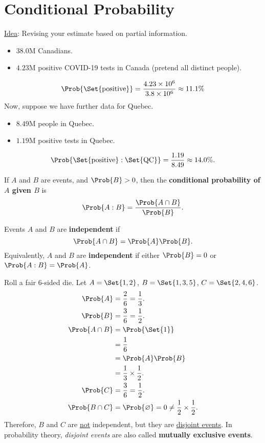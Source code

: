 \section*{Conditional Probability}
\underline{Idea}: Revising your estimate based on
partial information.
\begin{Example}{}{}
    \begin{itemize}
        \item $ 38.0 $M Canadians.
        \item $ 4.23 $M positive COVID-19 tests in Canada
              (pretend all distinct people).
    \end{itemize}
    \[ \Prob{\Set{\text{positive}}}=\frac{4.23\times 10^6}{3.8\times 10^6}\approx 11.1\% \]
    Now, suppose we have further data for Quebec.
    \begin{itemize}
        \item $ 8.49 $M people in Quebec.
        \item $ 1.19 $M positive tests in Quebec.
    \end{itemize}
    \[ \Prob{\Set{\text{positive}}\given \Set{\text{QC}}}=\frac{1.19}{8.49}\approx 14.0\%. \]
\end{Example}
\begin{Definition}{}{}
    If $ A $ and $ B $ are events, and $ \Prob{B}>0 $, then
    the \textbf{conditional probability of $A$ given $B$} is
    \[ \Prob{A\given B}=\frac{\Prob{A\cap B}}{\Prob{B}}. \]
\end{Definition}
\begin{Definition}{}{}
    Events $ A $ and $ B $ are \textbf{independent} if
    \[ \Prob{A\cap B}=\Prob{A}\Prob{B}. \]
    Equivalently, $ A $ and $ B $ are \textbf{independent} if either
    $ \Prob{B}=0 $ or $ \Prob{A\given B}=\Prob{A} $.
\end{Definition}
\begin{Example}{}{}
    Roll a fair 6-sided die. Let
    $ A=\Set{1,2} $, $ B=\Set{1,3,5} $, $ C=\Set{2,4,6} $.
    \begin{align*}
        \Prob{A}       & =\frac{2}{6}=\frac{1}{3}.                               \\
        \Prob{B}       & =\frac{3}{6}=\frac{1}{2}.                               \\
        \Prob{A\cap B}
                       & =\Prob{\Set{1}}                                         \\
                       & =\frac{1}{6}                                            \\
                       & =\Prob{A}\Prob{B}                                       \\
                       & =\frac{1}{3}\times \frac{1}{2}.                         \\
        \Prob{C}       & =\frac{3}{6}=\frac{1}{2}.                               \\
        \Prob{B\cap C} & =\Prob{\varnothing}=0\ne \frac{1}{2}\times \frac{1}{2}.
    \end{align*}
    Therefore, $ B $ and $ C $ are \underline{not} independent, but they are
    \underline{disjoint events}.
    In probability theory, \emph{disjoint events} are also called \textbf{mutually exclusive
        events}.
\end{Example}
